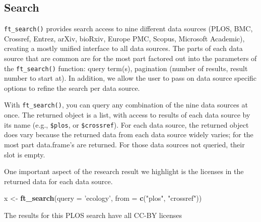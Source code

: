 \documentclass[author-year, review, 11pt]{components/elsarticle} %
\newenvironment{Shaded}{\begin{snugshade}}{\end{snugshade}}
\newcommand{\CommentTok}[1]{\textcolor[rgb]{0.56,0.35,0.01}{\textit{#1}}}
\newcommand{\DataTypeTok}[1]{\textcolor[rgb]{0.13,0.29,0.53}{#1}}
\newcommand{\KeywordTok}[1]{\textcolor[rgb]{0.13,0.29,0.53}{\textbf{#1}}}
\newcommand{\NormalTok}[1]{#1}
\newcommand{\OperatorTok}[1]{\textcolor[rgb]{0.81,0.36,0.00}{\textbf{#1}}}
\newcommand{\StringTok}[1]{\textcolor[rgb]{0.31,0.60,0.02}{#1}}
\begin{document}
\hypertarget{search}{%
\subsection{Search}\label{search}}

\texttt{ft\_search()} provides search access to nine different data
sources (PLOS, BMC, Crossref, Entrez, arXiv, bioRxiv, Europe PMC,
Scopus, Microsoft Academic), creating a mostly unified interface to all
data sources. The parts of each data source that are common are for the
most part factored out into the parameters of the \texttt{ft\_search()}
function: query term(s), pagination (number of results, result number to
start at). In addition, we allow the user to pass on data source
specific options to refine the search per data source.

With \texttt{ft\_search()}, you can query any combination of the nine
data sources at once. The returned object is a list, with access to
results of each data source by its name (e.g., \texttt{\$plos}, or
\texttt{\$crossref}). For each data source, the returned object does
vary because the returned data from each data source widely varies; for
the most part data.frame's are returned. For those data sources not
queried, their slot is empty.

One important aspect of the research result we highlight is the licenses
in the returned data for each data source.

\begin{Shaded}
\begin{Highlighting}[]
\NormalTok{x <-}\StringTok{ }\KeywordTok{ft_search}\NormalTok{(}\DataTypeTok{query =} \StringTok{'ecology'}\NormalTok{, }\DataTypeTok{from =} \KeywordTok{c}\NormalTok{(}\StringTok{"plos"}\NormalTok{, }\StringTok{"crossref"}\NormalTok{))}
\end{Highlighting}
\end{Shaded}

The results for this PLOS search have all CC-BY licenses

\begin{Shaded}
\end{Shaded}
\end{document}
